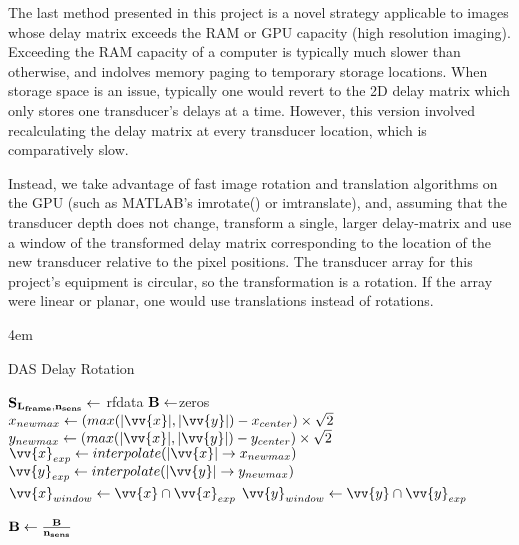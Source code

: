     The last method presented in this project is a novel strategy applicable to images whose delay matrix exceeds the RAM or GPU capacity (high resolution imaging). Exceeding the RAM capacity of a computer is typically much slower than otherwise, and indolves memory paging \cite{ResolveOutMemory} \cite{PagingOperatingSystem2016} to temporary storage locations. When storage space is an issue, typically one would revert to the 2D delay matrix which only stores one transducer's delays at a time. However, this version involved recalculating the delay matrix at every transducer location, which is comparatively slow.

    Instead, we take advantage of fast image rotation and translation algorithms on the GPU (such as MATLAB's imrotate() \cite{RotateImageMATLAB} or imtranslate\cite{TranslateImageMATLAB}), and, assuming that the transducer depth does not change, transform a single, larger delay-matrix and use a window of the transformed delay matrix corresponding to the location of the new transducer relative to the pixel positions. The transducer array for this project's equipment is circular, so the transformation is a rotation. If the array were linear or planar, one would use translations instead of rotations.

    \begin{algorithm} [H]
        \parindent4em
        \normalem
        \caption{DAS Delay Rotation}\label{algo:frame_rotate}
            $\bf{S}_{L_{frame},n_{sens}} \gets$ rfdata\;
            $\bf{B} \gets $zeros\;
            $x_{newmax} \gets (max(|\vv{x}|,|\vv{y}|) - x_{center})\times \sqrt{2}$\;
            $y_{newmax} \gets (max(|\vv{x}|,|\vv{y}|) - y_{center})\times \sqrt{2}$\;
            $\vv{x}_{exp} \gets interpolate(|\vv{x}| \to x_{newmax})$\;
            $\vv{y}_{exp} \gets interpolate(|\vv{y}| \to y_{newmax})$\;
            $\vv{x}_{window} \gets \vv{x} \cap \vv{x}_{exp}$\;
            $\vv{y}_{window} \gets \vv{y} \cap \vv{y}_{exp}$\;

            $\bf{B} \gets \frac{\bf{B}}{n_{sens}}$\;
    \end{algorithm}

